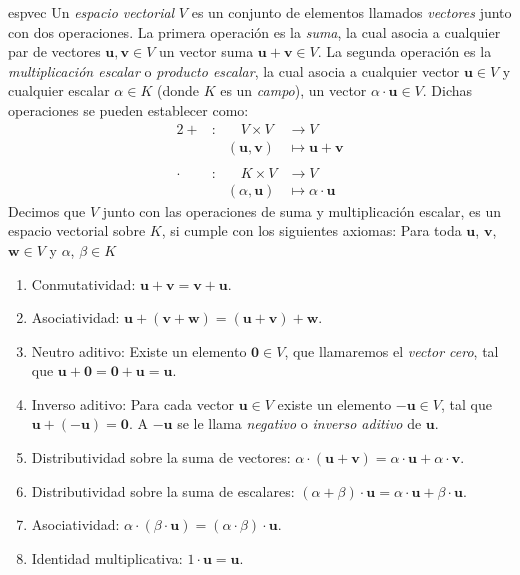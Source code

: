 \begin{definicion}{}{espvec}
    Un \emph{espacio vectorial} $V$ es un conjunto de elementos llamados \emph{vectores} junto con dos operaciones. La primera operación es la \emph{suma}, la cual asocia a cualquier par de vectores $\mathbf{u}, \mathbf{v} \in V$ un vector suma $\mathbf{u} + \mathbf{v} \in V$. La segunda operación es la \emph{multiplicación escalar} o \emph{producto escalar}, la cual asocia a cualquier vector $\mathbf{u} \in V$ y cualquier escalar $\alpha \in K$ (donde $K$ es un \emph{campo}), un vector $\alpha \cdot \mathbf{u} \in V$. Dichas operaciones se pueden establecer como:
    \begin{alignat*}{2}
        + &: & \quad V \times V & \longrightarrow V \\
        & & (\mathbf{u}, \mathbf{v}) & \longmapsto \mathbf{u} + \mathbf{v} \\
        & \\
        \cdot &: & \quad K \times V & \longrightarrow V \\
        & & (\alpha, \mathbf{u}) & \longmapsto \alpha \cdot \mathbf{u}
    \end{alignat*}
    Decimos que $V$ junto con las operaciones de suma y multiplicación escalar, es un espacio vectorial sobre $K$, si cumple con los siguientes axiomas: Para toda $\mathbf{u}$, $\mathbf{v}$, $\mathbf{w} \in V$ y $\alpha$, $\beta \in K$
    \begin{enumerate}[label=\roman*), topsep=6pt, itemsep=0pt]
        \item Conmutatividad: $\mathbf{u} + \mathbf{v} = \mathbf{v} + \mathbf{u}$.
        \item Asociatividad: $\mathbf{u} + (\mathbf{v} + \mathbf{w}) = (\mathbf{u} + \mathbf{v}) + \mathbf{w}$.
        \item Neutro aditivo: Existe un elemento $\mathbf{0} \in V$, que llamaremos el \emph{vector cero}, tal que $\mathbf{u} + \mathbf{0} = \mathbf{0} + \mathbf{u} = \mathbf{u}$.
        \item Inverso aditivo: Para cada vector $\mathbf{u} \in V$ existe un elemento $-\mathbf{u} \in V$, tal que $\mathbf{u} + (-\mathbf{u}) = \mathbf{0}$. A $-\mathbf{u}$ se le llama \emph{negativo} o \emph{inverso aditivo} de $\mathbf{u}$.
        \item Distributividad sobre la suma de vectores: $\alpha \cdot (\mathbf{u} + \mathbf{v}) = \alpha \cdot \mathbf{u} + \alpha \cdot \mathbf{v}$.
        \item Distributividad sobre la suma de escalares: $(\alpha + \beta) \cdot \mathbf{u} = \alpha \cdot \mathbf{u} + \beta \cdot \mathbf{u}$.
        \item Asociatividad: $\alpha \cdot (\beta \cdot \mathbf{u}) = (\alpha \cdot \beta) \cdot \mathbf{u}$.
        \item Identidad multiplicativa: $1 \cdot \mathbf{u} = \mathbf{u}$.
    \end{enumerate}
\end{definicion}


